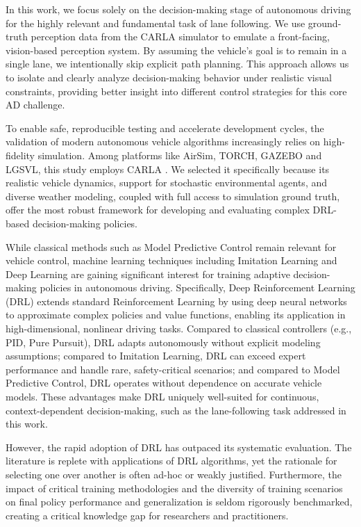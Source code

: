 \documentclass[]{interact}
\begin{document}
In this work, we focus solely on the decision-making stage of autonomous driving for the highly relevant and fundamental task of lane following. We use ground-truth perception data from the CARLA simulator to emulate a front-facing, vision-based perception system. By assuming the vehicle's goal is to remain in a single lane, we intentionally skip explicit path planning. This approach allows us to isolate and clearly analyze decision-making behavior under realistic visual constraints, providing better insight into different control strategies for this core AD challenge.

To enable safe, reproducible testing and accelerate development cycles, the validation of modern autonomous vehicle algorithms increasingly relies on high-fidelity simulation. Among platforms like AirSim, TORCH, GAZEBO and LGSVL, this study employs CARLA \cite{dosovitskiy2017carla}. We selected it specifically because its realistic vehicle dynamics, support for stochastic environmental agents, and diverse weather modeling, coupled with full access to simulation ground truth, offer the most robust framework for developing and evaluating complex DRL-based decision-making policies.

While classical methods such as Model Predictive Control remain relevant for vehicle control, machine learning techniques including Imitation Learning and Deep Learning are gaining significant interest for training adaptive decision-making policies in autonomous driving. Specifically, Deep Reinforcement Learning (DRL) extends standard Reinforcement Learning by using deep neural networks to approximate complex policies and value functions, enabling its application in high-dimensional, nonlinear driving tasks. Compared to classical controllers (e.g., PID, Pure Pursuit), DRL adapts autonomously without explicit modeling assumptions; compared to Imitation Learning, DRL can exceed expert performance and handle rare, safety-critical scenarios; and compared to Model Predictive Control, DRL operates without dependence on accurate vehicle models. These advantages make DRL uniquely well-suited for continuous, context-dependent decision-making, such as the lane-following task addressed in this work.

However, the rapid adoption of DRL has outpaced its systematic evaluation. The literature is replete with applications of DRL algorithms, yet the rationale for selecting one over another is often ad-hoc or weakly justified. Furthermore, the impact of critical training methodologies and the diversity of training scenarios on final policy performance and generalization is seldom rigorously benchmarked, creating a critical knowledge gap for researchers and practitioners.
\end{document}
